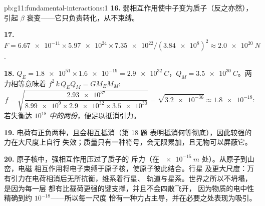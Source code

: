 \begin{solution}{pb:g11:fundamental-interactions:1}
\textbf{16.} 弱相互作用使中子变为质子（反之亦然），
引起 $\beta$ 衰变——它只负责转化，从不束缚。

\textbf{17.} $F = \num{6.67e-11} \times \num{5.97e24} \times
\num{7.35e22}/(\num{3.84e8})^2 \approx \qty{2.0e20}{N}$.

\textbf{18.} $Q_E = \num{1.8e51} \times \num{1.6e-19} =
\qty{2.9e32}{C}$，$Q_M = \qty{3.5e30}{C}$。两力相等意味着
$f^2\,k\,Q_E Q_M = G M_E M_M$:
\[
f = \sqrt{\frac{\num{2.93e37}}{\num{8.99e9} \times \num{2.9e32}
\times \num{3.5e30}}} = \sqrt{\num{3.2e-36}} \approx \num{1.8e-18} :
\]
若失衡达 \emph{$10^{18}$ 中的两份}，便足以抵消引力。

\textbf{19.} 电荷有正负两种，且会相互抵消（第 18 题
表明抵消何等彻底），因此较强的力在大尺度上自行
失效；质量只有一种符号，会无限累加，且无物可以屏蔽它。

\textbf{20.} 原子核中，强相互作用压过了质子的
斥力（在 $\qty{e-15}{m}$ 处）。从原子到山峦，电磁
相互作用将电子束缚于原子核，使原子彼此结合。行星
及更大尺度：万有引力在电荷相消后无所抗衡，维系着行星、
轨道与星系。世界之所以不坍塌，是因为每一层
都有比载荷更强的键支撑，并且不会四散飞开，
因为物质的电中性精确到约 $10^{-18}$——所以每一尺度
恰有一种力占主导，并在必要之处表现为吸引。
\end{solution}
